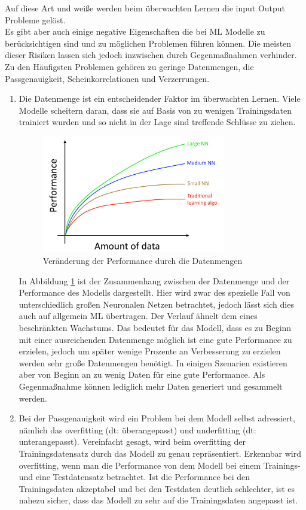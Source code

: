 \begin{onehalfspace}
        Auf diese Art und weiße werden beim überwachten Lernen die input Output Probleme gelöst.\cite{Ng2018}
        \\
        Es gibt aber auch einige negative Eigenschaften die bei \ac{ML} Modelle zu berücksichtigen sind und zu möglichen Problemen führen können. Die meisten dieser Risiken lassen sich jedoch inzwischen durch Gegenmaßnahmen verhinder. Zu den Häufigsten Problemen gehören zu geringe Datenmengen, die Passgenauigkeit, Scheinkorrelationen und Verzerrungen. 
        \begin{enumerate}
            \item Die Datenmenge ist ein entscheidender Faktor im überwachten Lernen. Viele Modelle scheitern daran, dass sie auf Basis von zu wenigen Trainingsdaten trainiert wurden und so nicht in der Lage sind treffende Schlüsse zu ziehen.\cite{Datenkommission2019}\cite{Ng2018}
            \begin{figure}[h]
                \centering
                \includegraphics[width = 8cm]{Bilder/Datenmenge.png}
                \caption{Veränderung der Performance durch die Datenmengen \cite{Ng2018}}
                \label{fig:Datavolume}
            \end{figure} 
            In Abbildung \ref*{fig:Datavolume} ist der Zusammenhang zwischen der Datenmenge und der Performance des Modells dargestellt. Hier wird zwar des spezielle Fall von unterschiedlich großen Neuronalen Netzen betrachtet, jedoch lässt sich dies auch auf allgemein \ac*{ML} übertragen. Der Verlauf ähnelt dem eines beschränkten Wachstums. Das bedeutet für das Modell, dass es zu Beginn mit einer ausreichenden Datenmenge möglich ist eine gute Performance zu erzielen, jedoch um später wenige Prozente an Verbesserung zu erzielen werden sehr große Datenmengen benötigt.\cite{Ng2018} In einigen Szenarien existieren aber von Beginn an zu wenig Daten für eine gute Performance. Als Gegenmaßnahme können lediglich mehr Daten generiert und gesammelt werden.
            \item Bei der Passgenauigkeit wird ein Problem bei dem Modell selbst adressiert, nämlich das overfitting (\ac*{dt}: \glqq{}überangepasst\grqq{}) und underfitting (\ac*{dt}: \glqq{}unterangepasst\grqq{}). Vereinfacht gesagt, wird beim overfitting der Trainingsdatensatz durch das Modell zu genau repräsentiert. Erkennbar wird overfitting, wenn man die Performance von dem Modell bei einem Trainings- und eine Testdatensatz betrachtet. Ist die Performance bei den Trainingsdaten akzeptabel und bei den Testdaten deutlich schlechter, ist es nahezu sicher, dass das Modell zu sehr auf die Trainingsdaten angepasst ist.

\end{enumerate}
\end{onehalfspace}
